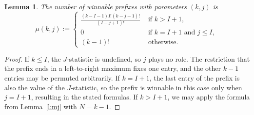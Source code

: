 \documentclass[11pt]{amsart}   %
\newtheorem{lemma}[theorem]{Lemma}
\theoremstyle{definition}
\theoremstyle{remark}
\numberwithin{equation}{section}
\theoremstyle{theorem}
\begin{document}
\begin{lemma}\label{l:muwin}
The number of winnable prefixes with parameters $(k,j)$ is
\[
    \mu(k,j) := \begin{cases}
        \frac{(k-I-1) I! (k-j-1)!}{(I-j+1)!} & \text{ if $k > I+1$, } \\
        0 & \text{ if $k = I+1$ and $j \leq I$, } \\
        (k-1)! & \text{ otherwise. } 
    \end{cases}
\]
\end{lemma}
\begin{proof}
If $k \leq I$, the $J$-statistic is undefined, so $j$ plays no role.  The restriction that the prefix ends in a left-to-right maximum fixes one entry, and the other $k-1$ entries may be permuted arbitrarily.  If $k = I+1$, the last entry of the prefix is also the value of the $J$-statistic, so the prefix is winnable in this case only when $j = I+1$, resulting in the stated formulas.  If $k > I+1$, we may apply the formula from Lemma~\ref{l:mj} with $N = k-1$.
\end{proof}
\end{document}

